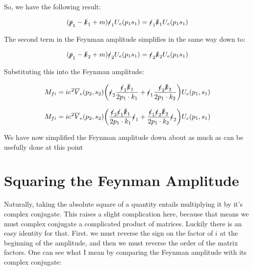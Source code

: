 \documentclass[a4]{article}
\begin{document}
    So, we have the following result:

    \begin{equation}
        (\slashed{p}_1 - \slashed{k}_1 + m) \slashed{\epsilon}_1 U_e (p_1 s_1) = \slashed{\epsilon}_1 \slashed{k}_1 U_e (p_1 s_1)
    \end{equation}

    The second term in the Feynman amplitude simplifies in the same way down to:

    \begin{equation}
        (\slashed{p}_1 - \slashed{k}_2 + m) \slashed{\epsilon}_2 U_e (p_1 s_1) = \slashed{\epsilon}_2 \slashed{k}_2 U_e (p_1 s_1)
    \end{equation}

    Substituting this into the Feynman amplitude:

    \begin{equation}
        M_{fi} = i e^2 \overline{V}_e (p_2, s_2) \bigg( \slashed{\epsilon}_2 \frac{\slashed{\epsilon}_1 \slashed{k}_1}{2 p_1 \cdot k_1} + \slashed{\epsilon}_1 \frac{\slashed{\epsilon}_2 \slashed{k}_2}{2 p_1 \cdot k_2} \bigg) U_e (p_1, s_1)
    \end{equation}

    \begin{equation}
        M_{fi} = i e^2 \overline{V}_e (p_2, s_2) \bigg( \frac{\slashed{\epsilon}_2 \slashed{\epsilon}_1 \slashed{k}_1}{2 p_1 \cdot k_1} \slashed{\epsilon}_1  + \frac{\slashed{\epsilon}_1 \slashed{\epsilon}_2 \slashed{k}_2}{2 p_1 \cdot k_2} \slashed{\epsilon}_2 \bigg) U_e (p_1, s_1)
    \end{equation}

    We have now simplified the Feynman amplitude down about as much as can be usefully done at this point

    \section*{Squaring the Feynman Amplitude}

    Naturally, taking the absolute square of a quantity entails multiplying it by it's complex conjugate. This raises a slight complication here,  because that means we must complex conjugate a complicated product of matrices. Luckily there is an easy
    identity for that. First. we must reverse the sign on the factor of $i$ at the beginning of the amplitude, and then we must reverse the order of the matrix factors. One can see what I mean by comparing the Feynman amplitude with its complex conjugate:
\end{document}
